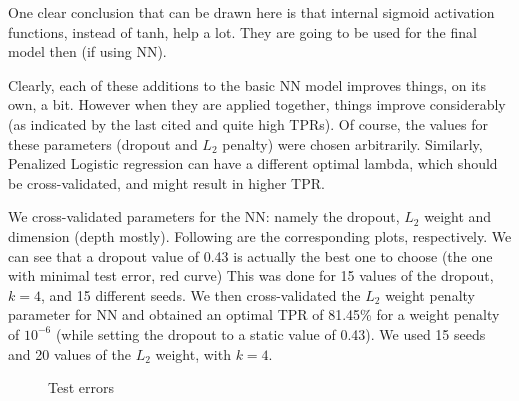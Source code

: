 \documentclass{article} %
\begin{document}
One clear conclusion that can be drawn here is that internal sigmoid activation functions, instead of tanh, help a lot. They are going to be used for the final model then (if using NN).

Clearly, each of these additions to the basic NN model improves things, on its own, a bit. However when they are applied together, things improve considerably (as indicated by the last cited and quite high TPRs). Of course, the values for these parameters (dropout and $L_2$ penalty) were chosen arbitrarily. Similarly, Penalized Logistic regression can have a different optimal lambda, which should be cross-validated, and might result in higher TPR. 

We cross-validated parameters for the NN: namely the dropout, $L_2$ weight and dimension (depth mostly). Following are the corresponding plots, respectively. We can see that a dropout value of 0.43 is actually the best one to choose (the one with minimal test error, red curve) This was done for 15 values of the dropout, $k=4$, and 15 different seeds. We then cross-validated the $L_2$ weight penalty parameter for NN and obtained an optimal TPR of 81.45\% for a weight penalty of $10^{-6}$ (while setting the dropout to a static value of 0.43). We used 15 seeds and 20 values of the $L_2$ weight, with $k = 4$.
\begin{figure}
\centering     %
{}
\caption{Test errors}
\end{figure}
\end{document}
